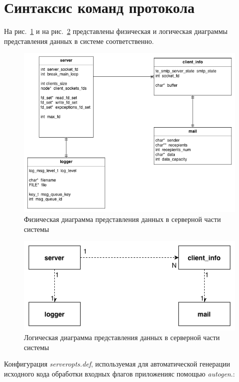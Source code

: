 \documentclass[a4paper,12pt]{report}
\begin{document}
\section{Синтаксис команд протокола}
На рис.~\ref{fig:uml_server_ph} и на рис.~\ref{fig:uml_server_log} представлены физическая и логическая
диаграммы представления данных в системе соответственно.

\begin{figure}
    \centering
    \includegraphics[width=\textwidth]{../images/uml_server_ph.png}
    \caption{Физическая диаграмма представления данных в серверной части системы}
    \label{fig:uml_server_ph}
\end{figure}

\begin{figure}
    \centering
    \includegraphics[width=\textwidth]{../images/uml_server_log.png}
    \caption{Логическая диаграмма представления данных в серверной части системы}
    \label{fig:uml_server_log}
\end{figure}


Конфигурация \textit{serveropts.def}, используемая для автоматической генерации исходного кода обработки
входных флагов приложенияс помощью \textit{autogen}.:
\end{document}

